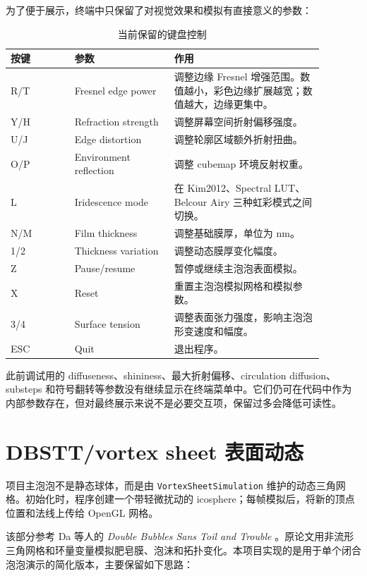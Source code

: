 \documentclass[UTF8,a4paper,11pt]{ctexart}
\newcommand{\codepath}[1]{\texttt{#1}}
\begin{document}
为了便于展示，终端中只保留了对视觉效果和模拟有直接意义的参数：

\begin{table}[H]
  \centering
  \caption{当前保留的键盘控制}
  \begin{tabular}{p{0.18\linewidth}p{0.28\linewidth}p{0.42\linewidth}}
    \toprule
    按键 & 参数 & 作用 \\
    \midrule
    R/T & Fresnel edge power & 调整边缘 Fresnel 增强范围。数值越小，彩色边缘扩展越宽；数值越大，边缘更集中。\\
    Y/H & Refraction strength & 调整屏幕空间折射偏移强度。\\
    U/J & Edge distortion & 调整轮廓区域额外折射扭曲。\\
    O/P & Environment reflection & 调整 cubemap 环境反射权重。\\
    L & Iridescence mode & 在 Kim2012、Spectral LUT、Belcour Airy 三种虹彩模式之间切换。\\
    N/M & Film thickness & 调整基础膜厚，单位为 nm。\\
    1/2 & Thickness variation & 调整动态膜厚变化幅度。\\
    Z & Pause/resume & 暂停或继续主泡泡表面模拟。\\
    X & Reset & 重置主泡泡模拟网格和模拟参数。\\
    3/4 & Surface tension & 调整表面张力强度，影响主泡泡形变速度和幅度。\\
    ESC & Quit & 退出程序。\\
    \bottomrule
  \end{tabular}
\end{table}

此前调试用的 diffuseness、shininess、最大折射偏移、circulation diffusion、substeps 和符号翻转等参数没有继续显示在终端菜单中。它们仍可在代码中作为内部参数存在，但对最终展示来说不是必要交互项，保留过多会降低可读性。

\section{DBSTT/vortex sheet 表面动态}

项目主泡泡不是静态球体，而是由 \codepath{VortexSheetSimulation} 维护的动态三角网格。初始化时，程序创建一个带轻微扰动的 icosphere；每帧模拟后，将新的顶点位置和法线上传给 OpenGL 网格。

该部分参考 Da 等人的 \textit{Double Bubbles Sans Toil and Trouble} \cite{da2015doublebubbles}。原论文用非流形三角网格和环量变量模拟肥皂膜、泡沫和拓扑变化。本项目实现的是用于单个闭合泡泡演示的简化版本，主要保留如下思路：
\end{document}
